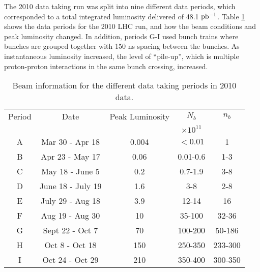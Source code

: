 The 2010 data taking run was split into nine different data periods, which corresponded to a total integrated luminosity delivered of 48.1 $\rm pb^{-1}$.
Table \ref{Det:Periods} shows the data periods for the 2010 LHC run, and how the beam conditions and peak luminosity changed.  
In addition, periods G-I used bunch trains where bunches are grouped together with 150 ns spacing between the bunches.  
As instantaneous luminosity increased, the level of ``pile-up'', which is multiple proton-proton interactions in the same bunch crossing, increased.

\begin{table}
\begin{center}
\begin{tabular}{|c|c|c|c|c|}
\hline
Period&Date&Peak Luminosity& $N_b$ & $n_b$ \\
& &\lumi{}& $\times10^{11}$ & \\
\hline
A & Mar 30 - Apr 18 & 0.004 & $<0.01$ & 1 \\
B & Apr 23 - May 17 & 0.06 & 0.01-0.6 & 1-3 \\
C & May 18 - June 5 & 0.2 & 0.7-1.9 & 3-8 \\
D & June 18 - July 19 & 1.6 & 3-8 & 2-8 \\
E & July 29 - Aug 18 & 3.9 & 12-14 & 16 \\
F & Aug 19 - Aug 30 & 10 & 35-100 & 32-36 \\
G & Sept 22 - Oct 7 & 70 & 100-200 & 50-186 \\
H & Oct 8 - Oct 18 & 150 & 250-350 & 233-300 \\
I & Oct 24 - Oct 29 & 210 & 350-400 & 300-350 \\
\hline
\end{tabular}
\caption[2010 Data Period Information]{
   Beam information for the different data taking periods in 2010 data.
\label{Det:Periods}
}
\end{center}
\end{table}


